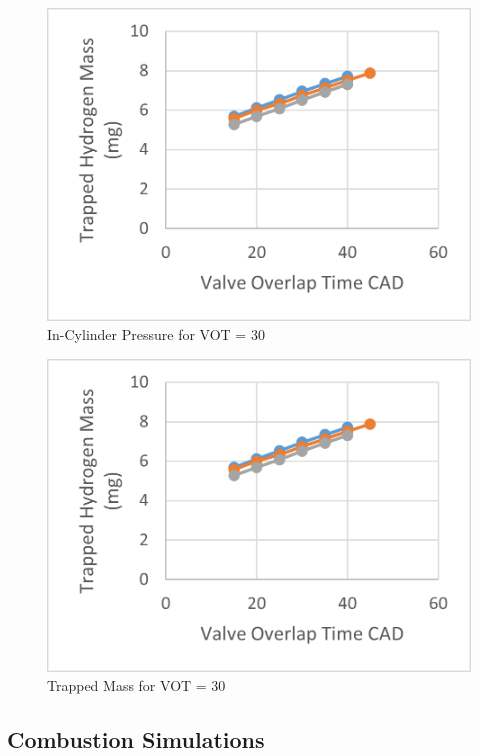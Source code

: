 \documentclass[conference]{IEEEtran}
\begin{document}
\begin{figure}[htbp]
    \centerline{\includegraphics{Plots/trapped mass.png}}
    \caption{In-Cylinder Pressure for VOT = 30}
    \label{plt_tttt}
    \end{figure}

\begin{figure}[htbp]
    \centerline{\includegraphics{Plots/trapped mass.png}}
    \caption{Trapped Mass for VOT = 30}
    \label{plt_ttt}
    \end{figure}



\subsection{Combustion Simulations}
\end{document}
